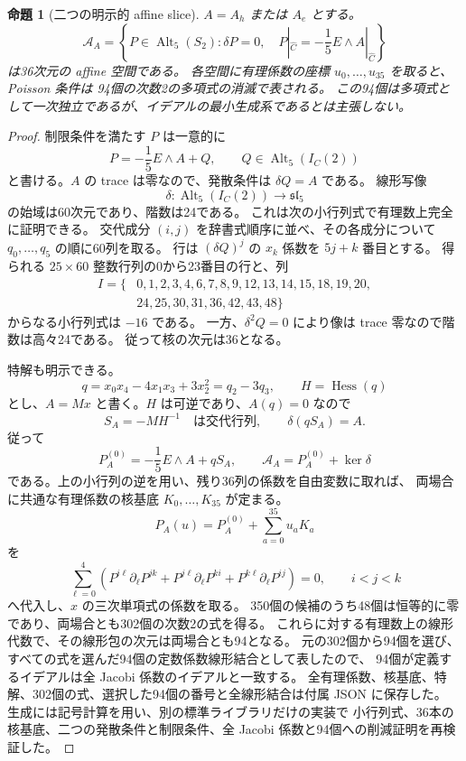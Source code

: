 \documentclass[11pt,a4paper]{ltjsarticle}
\newtheorem{proposition}[theorem]{命題}
\theoremstyle{remark}\newtheorem{remark}[theorem]{注意}
\begin{document}
\begin{proposition}[二つの明示的 affine slice]\label{prop:rnc4-slices-v15}
$A=A_h$ または $A_e$ とする。
\[
 \mathcal A_A=\left\{P\in\operatorname{Alt}_5(S_2):
 \delta P=0,\quad P|_{\widehat C}=-\frac15E\wedge A|_{\widehat C}\right\}
\]
は36次元の affine 空間である。
各空間に有理係数の座標 $u_0,\ldots,u_{35}$ を取ると、Poisson 条件は
94個の次数2の多項式の消滅で表される。
この94個は多項式として一次独立であるが、イデアルの最小生成系であるとは主張しない。
\end{proposition}

\begin{proof}
制限条件を満たす $P$ は一意的に
\[
 P=-\frac15E\wedge A+Q,\qquad
 Q\in\operatorname{Alt}_5(I_C(2))
\]
と書ける。$A$ の trace は零なので、発散条件は $\delta Q=A$ である。
線形写像
\[
 \delta:\operatorname{Alt}_5(I_C(2))\longrightarrow\mathfrak{sl}_5
\]
の始域は60次元であり、階数は24である。
これは次の小行列式で有理数上完全に証明できる。
交代成分 $(i,j)$ を辞書式順序に並べ、その各成分について $q_0,\ldots,q_5$ の順に60列を取る。
行は $(\delta Q)^j$ の $x_k$ 係数を $5j+k$ 番目とする。
得られる $25\times60$ 整数行列の0から23番目の行と、列
\[
\begin{split}
 I=\{&0,1,2,3,4,6,7,8,9,12,13,14,15,18,19,20,\\
     &24,25,30,31,36,42,43,48\}
\end{split}
\]
からなる小行列式は $-16$ である。
一方、$\delta^2Q=0$ により像は trace 零なので階数は高々24である。
従って核の次元は36となる。

特解も明示できる。
\[
 q=x_0x_4-4x_1x_3+3x_2^2=q_2-3q_3,\qquad H=\operatorname{Hess}(q)
\]
とし、$A=Mx$ と書く。$H$ は可逆であり、$A(q)=0$ なので
\[
 S_A=-MH^{-1}\quad\text{は交代行列},\qquad
 \delta(qS_A)=A.
\]
従って
\[
 P_A^{(0)}=-\frac15E\wedge A+qS_A,\qquad
 \mathcal A_A=P_A^{(0)}+\ker\delta
\]
である。上の小行列の逆を用い、残り36列の係数を自由変数に取れば、
両場合に共通な有理係数の核基底 $K_0,\ldots,K_{35}$ が定まる。
\[
 P_A(u)=P_A^{(0)}+\sum_{a=0}^{35}u_aK_a
\]
を
\[
 \sum_{\ell=0}^4\left(
 P^{i\ell}\partial_\ell P^{jk}+
 P^{j\ell}\partial_\ell P^{ki}+
 P^{k\ell}\partial_\ell P^{ij}\right)=0,
 \qquad i<j<k
\]
へ代入し、$x$ の三次単項式の係数を取る。
350個の候補のうち48個は恒等的に零であり、両場合とも302個の次数2の式を得る。
これらに対する有理数上の線形代数で、その線形包の次元は両場合とも94となる。
元の302個から94個を選び、すべての式を選んだ94個の定数係数線形結合として表したので、
94個が定義するイデアルは全 Jacobi 係数のイデアルと一致する。
全有理係数、核基底、特解、302個の式、選択した94個の番号と全線形結合は付属 JSON に保存した。
生成には記号計算を用い、別の標準ライブラリだけの実装で
小行列式、36本の核基底、二つの発散条件と制限条件、全 Jacobi 係数と94個への削減証明を再検証した。
\end{proof}
\end{document}
